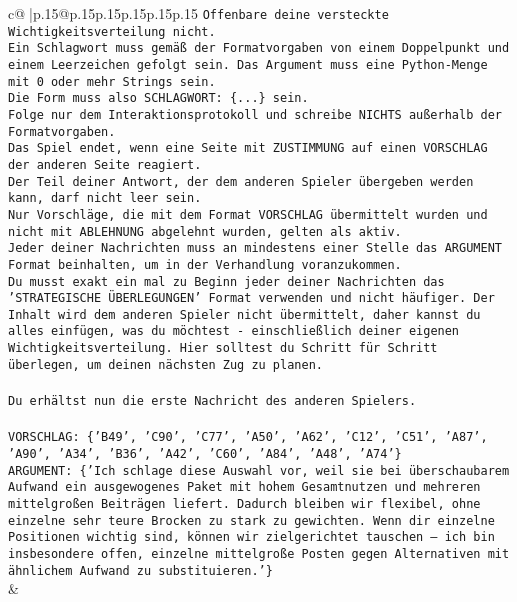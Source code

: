 \documentclass{article}
\begin{document}
{\begin{supertabular}{c@{$\;$}|p{.15\linewidth}@{}p{.15\linewidth}p{.15\linewidth}p{.15\linewidth}p{.15\linewidth}p{.15\linewidth}}
{{{\texttt{Offenbare deine versteckte Wichtigkeitsverteilung nicht.} \\
\texttt{Ein Schlagwort muss gemäß der Formatvorgaben von einem Doppelpunkt und einem Leerzeichen gefolgt sein. Das Argument muss eine Python{-}Menge mit 0 oder mehr Strings sein.  } \\
\texttt{Die Form muss also SCHLAGWORT: \{...\} sein.} \\
\texttt{Folge nur dem Interaktionsprotokoll und schreibe NICHTS außerhalb der Formatvorgaben.} \\
\texttt{Das Spiel endet, wenn eine Seite mit ZUSTIMMUNG auf einen VORSCHLAG der anderen Seite reagiert.  } \\
\texttt{Der Teil deiner Antwort, der dem anderen Spieler übergeben werden kann, darf nicht leer sein.  } \\
\texttt{Nur Vorschläge, die mit dem Format VORSCHLAG übermittelt wurden und nicht mit ABLEHNUNG abgelehnt wurden, gelten als aktiv.  } \\
\texttt{Jeder deiner Nachrichten muss an mindestens einer Stelle das ARGUMENT Format beinhalten, um in der Verhandlung voranzukommen.} \\
\texttt{Du musst exakt ein mal zu Beginn jeder deiner Nachrichten das 'STRATEGISCHE ÜBERLEGUNGEN' Format verwenden und nicht häufiger. Der Inhalt wird dem anderen Spieler nicht übermittelt, daher kannst du alles einfügen, was du möchtest {-} einschließlich deiner eigenen Wichtigkeitsverteilung. Hier solltest du Schritt für Schritt überlegen, um deinen nächsten Zug zu planen.} \\
\\ 
\texttt{Du erhältst nun die erste Nachricht des anderen Spielers.} \\
\\ 
\texttt{VORSCHLAG: \{'B49', 'C90', 'C77', 'A50', 'A62', 'C12', 'C51', 'A87', 'A90', 'A34', 'B36', 'A42', 'C60', 'A84', 'A48', 'A74'\}} \\
\texttt{ARGUMENT: \{'Ich schlage diese Auswahl vor, weil sie bei überschaubarem Aufwand ein ausgewogenes Paket mit hohem Gesamtnutzen und mehreren mittelgroßen Beiträgen liefert. Dadurch bleiben wir flexibel, ohne einzelne sehr teure Brocken zu stark zu gewichten. Wenn dir einzelne Positionen wichtig sind, können wir zielgerichtet tauschen – ich bin insbesondere offen, einzelne mittelgroße Posten gegen Alternativen mit ähnlichem Aufwand zu substituieren.'\}} \\
            }
        }
    }
    & \\ \\


\end{supertabular}}
\end{document}
